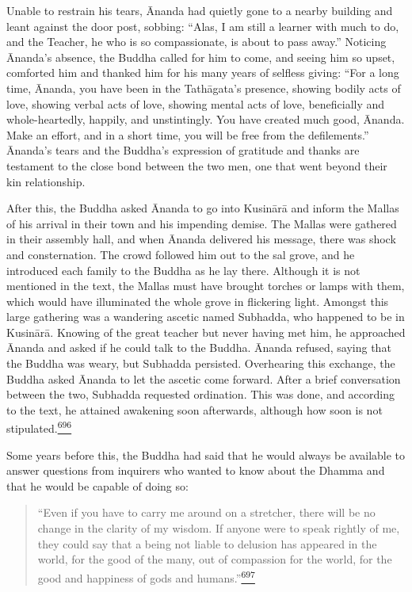 Unable to restrain his tears, Ānanda had quietly gone to a nearby
building and leant against the door post, sobbing: ``Alas, I am still a
learner with much to do, and the Teacher, he who is so compassionate, is
about to pass away.'' Noticing Ānanda's absence, the Buddha called for
him to come, and seeing him so upset, comforted him and thanked him for
his many years of selfless giving: ``For a long time, Ānanda, you have
been in the Tathāgata's presence, showing bodily acts of love, showing
verbal acts of love, showing mental acts of love, beneficially and
whole-heartedly, happily, and unstintingly. You have created much good,
Ānanda. Make an effort, and in a short time, you will be free from the
defilements.'' Ānanda's tears and the Buddha's expression of gratitude
and thanks are testament to the close bond between the two men, one that
went beyond their kin relationship.

After this, the Buddha asked Ānanda to go into Kusinārā and inform the
Mallas of his arrival in their town and his impending demise. The Mallas
were gathered in their assembly hall, and when Ānanda delivered his
message, there was shock and consternation. The crowd followed him out
to the sal grove, and he introduced each family to the Buddha as he lay
there. Although it is not mentioned in the text, the Mallas must have
brought torches or lamps with them, which would have illuminated the
whole grove in flickering light. Amongst this large gathering was a
wandering ascetic named Subhadda, who happened to be in Kusinārā.
Knowing of the great teacher but never having met him, he approached
Ānanda and asked if he could talk to the Buddha. Ānanda refused, saying
that the Buddha was weary, but Subhadda persisted. Overhearing this
exchange, the Buddha asked Ānanda to let the ascetic come forward. After
a brief conversation between the two, Subhadda requested ordination.
This was done, and according to the text, he attained awakening soon
afterwards, although how soon is not
stipulated.\label{footprints_split_017.html_fnref696}\hyperref[footprints_split_025.htmlux5cux23fn696]{\textsuperscript{696}}

Some years before this, the Buddha had said that he would always be
available to answer questions from inquirers who wanted to know about
the Dhamma and that he would be capable of doing so:

\begin{quote}
``Even if you have to carry me around on a stretcher, there will be no
change in the clarity of my wisdom. If anyone were to speak rightly of
me, they could say that a being not liable to delusion has appeared in
the world, for the good of the many, out of compassion for the world,
for the good and happiness of gods and
humans.''\label{footprints_split_017.html_fnref697}\hyperref[footprints_split_025.htmlux5cux23fn697]{\textsuperscript{697}}
\end{quote}

